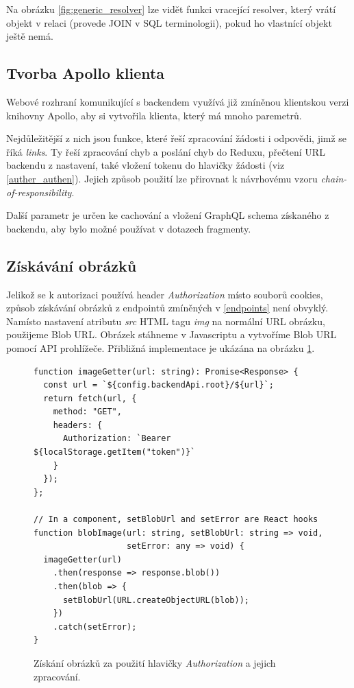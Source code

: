 Na obrázku \ref{fig:generic_resolver} lze vidět funkci vracející resolver, který vrátí objekt v relaci (provede JOIN v SQL terminologii),
pokud ho vlastnící objekt ještě nemá.

\subsection{Tvorba Apollo klienta}

\noindent
Webové rozhraní komunikující s backendem využívá již zmíněnou klientskou verzi knihovny Apollo, aby si vytvořila klienta,
který má mnoho paremetrů.

Nejdůležitější z nich jsou funkce, které řeší zpracování žádosti i odpovědi, jimž se říká \textit{links}.
Ty řeší zpracování chyb a poslání chyb do Reduxu, přečtení URL backendu z nastavení, také vložení tokenu do hlavičky žádosti (viz \ref{auther_authen}).
Jejich způsob použití lze přirovnat k návrhovému vzoru \textit{chain-of-responsibility}.

Další parametr je určen ke cachování a vložení GraphQL schema získaného z backendu, aby bylo možné používat v dotazech fragmenty.

\subsection{Získávání obrázků}

\noindent
Jelikož se k autorizaci používá header \textit{Authorization} místo souborů cookies,
způsob získávání obrázků z endpointů zmíněných v \ref{endpoints} není obvyklý.
Namísto nastavení atributu \textit{src} HTML tagu \textit{img} na normální URL obrázku,
použijeme Blob URL. Obrázek stáhneme v Javascriptu a vytvoříme Blob URL pomocí API prohlížeče.
Přibližná implementace je ukázána na obrázku \ref{fig:image_getter}.

\begin{figure}[!htb]
\lstset{language=Javascript}
\begin{lstlisting}
function imageGetter(url: string): Promise<Response> {
  const url = `${config.backendApi.root}/${url}`;
  return fetch(url, {
    method: "GET",
    headers: {
      Authorization: `Bearer ${localStorage.getItem("token")}`
    }
  });
};

// In a component, setBlobUrl and setError are React hooks
function blobImage(url: string, setBlobUrl: string => void,
                   setError: any => void) {
  imageGetter(url)
    .then(response => response.blob())
    .then(blob => {
      setBlobUrl(URL.createObjectURL(blob));
    })
    .catch(setError);
}
\end{lstlisting}
\caption{Získání obrázků za použití hlavičky \textit{Authorization} a jejich zpracování.}
\label{fig:image_getter}
\end{figure}


